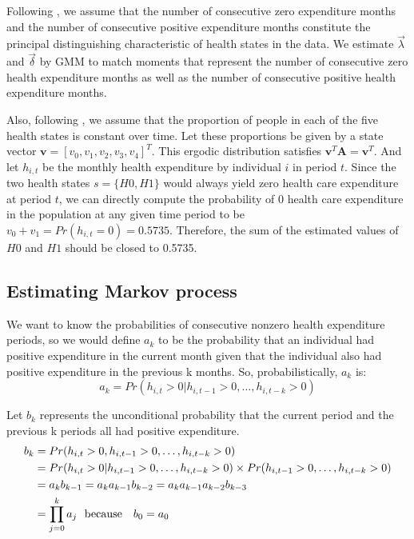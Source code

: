 \documentclass[letterpaper,12pt]{article}
\theoremstyle{definition}
\begin{document}
\begin{spacing}{1.5}{}
  Following \citet{evans}, we assume that the number of consecutive zero expenditure months and the number of consecutive positive expenditure months constitute the principal distinguishing characteristic of health states in the data. We estimate $\vec{\lambda}$ and $\vec{\delta}$ by GMM to match moments that represent the number of consecutive zero health expenditure months as well as the number of consecutive positive health expenditure months.\par
  
  Also, following \citet{evans}, we assume that the proportion of people in each of the five health states is constant over time. Let these proportions be given by a state vector $\textbf{v} = [v_0, v_1, v_2, v_3, v_4]^T$. This ergodic distribution satisfies $\textbf{v}^T\textbf{A} = \textbf{v}^T$. And let $h_{i,t}$ be the monthly health expenditure by individual $i$ in period $t$. Since the two health states $s = \{H0, H1\}$ would always yield zero health care expenditure at period $t$, we can directly compute the probability of 0 health care expenditure in the population at any given time period to be $v_0 + v_1 = Pr(h_{i,t} = 0) = 0.5735$. Therefore, the sum of the estimated values of $H0$ and $H1$ should be closed to 0.5735. \par


\subsection{Estimating Markov process}\label{SecEstimation1}

  We want to know the probabilities of consecutive nonzero health expenditure periods, so we would define $a_k$ to be the probability that an individual had positive expenditure in the current month given that the individual also had positive expenditure in the previous k months. So, probabilistically, $a_k$ is: 
  \begin{equation}\label{eq:ak}
    a_k = Pr(h_{i, t} > 0 | h_{i, t-1} > 0, \dots, h_{i, t-k} > 0)
  \end{equation}
  
  Let $b_k$ represents the unconditional probability that the current period and the previous k periods all had positive expenditure. 
  \begin{equation}\label{eq:bk}
  \begin{split}
    b_k &= Pr(h_{i, t} > 0, h_{i, t-1} > 0, \dots, h_{i, t-k} > 0) \\
        &= Pr(h_{i, t} > 0 | h_{i, t-1} > 0, \dots, h_{i, t-k} > 0) \times
           Pr(h_{i, t-1} > 0, \dots, h_{i, t-k} > 0) \\
        &= a_kb_{k-1} = a_ka_{k-1}b_{k-2} = a_ka_{k-1}a_{k-2}b_{k-3} \\
        &= \prod_{j = 0}^{k} a_j 
            \text{\space \space because \space \space} b_0 = a_0 \\   
  \end{split}
  \end{equation}
  

\end{spacing}
\end{document}
